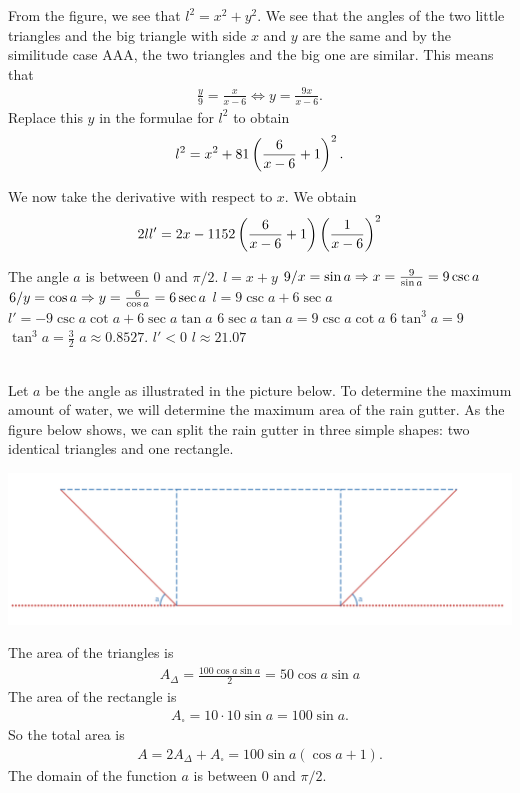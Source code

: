 	From the figure, we see that $l^2 = x^2 + y^2$. We see that the angles of the two little triangles and the big triangle with side $x$ and $y$ are the same and by the similitude case AAA, the two triangles and the big one are similar. This means that
		\begin{align*}
		\frac{y}{9} = \frac{x}{x-6} \iff y = \frac{9x}{x - 6} .
		\end{align*}
	Replace this $y$ in the formulae for $l^2$ to obtain
		\begin{align*}
		l^2 = x^2 + 81 \left( \frac{6}{x - 6} + 1 \right)^2 .
		\end{align*}
	
	We now take the derivative with respect to $x$. We obtain
		\begin{align*}
		2l l' = 2x - 1152 \left( \frac{6}{x - 6} + 1 \right) \left( \frac{1}{x - 6} \right)^2
		\end{align*}
		
		The angle $a$ is between $0$ and $\pi/2$.
	$l= x + y$
	$9/x = \sin a \Rightarrow x = \frac{9}{\sin a} = 9 \csc a$
	$6/y = \cos a \Rightarrow y = \frac{6}{\cos a} = 6 \sec a$
	$l = 9 \csc a + 6 \sec a$
	$l' = -9\csc a \cot a + 6 \sec a \tan a$
	$6 \sec a \tan a = 9 \csc a \cot a$
	$6 \tan^3 a = 9$
	$\tan^3 a = \frac{3}{2}$
	$a \approx 0.8527$.
	$l' < 0$
	$l \approx 21.07$
	
	\spc
	
	\\
	Let $a$ be the angle as illustrated in the picture below. To determine the maximum amount of water, we will determine the maximum area of the rain gutter. As the figure below shows, we can split the rain gutter in three simple shapes: two identical triangles and one rectangle.
		\begin{center}
		\includegraphics[scale=0.4]{number76.png}
		\end{center}
		
	The area of the triangles is 
		\begin{align*}
		A_{\Delta} = \frac{100 \cos a \sin a}{2} = 50 \cos a \sin a
		\end{align*}
	The area of the rectangle is
		\begin{align*}
		A_{\square} = 10 \cdot 10 \sin a = 100 \sin a .
		\end{align*}
	So the total area is
		\begin{align*}
		A = 2 A_{\Delta} + A_{\square} = 100 \sin a (\cos a + 1) .
		\end{align*}
	The domain of the function $a$ is between $0$ and $\pi/2$. 
	
